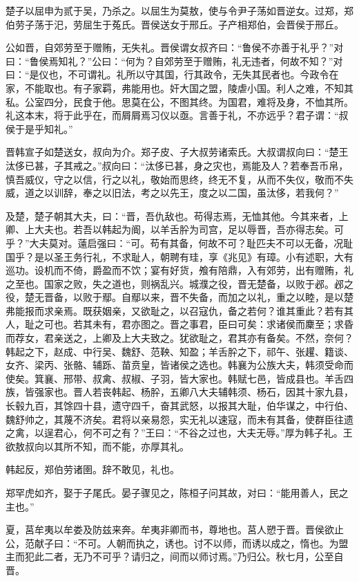 \documentclass[]{article}
\begin{document}
楚子以屈申为贰于吴，乃杀之。以屈生为莫敖，使与令尹子荡如晋逆女。过郑，郑伯劳子荡于汜，劳屈生于菟氏。晋侯送女于邢丘。子产相郑伯，会晋侯于邢丘。

公如晋，自郊劳至于赠贿，无失礼。晋侯谓女叔齐曰：``鲁侯不亦善于礼乎？''对曰：``鲁侯焉知礼？''公曰：``何为？自郊劳至于赠贿，礼无违者，何故不知？''对曰：``是仪也，不可谓礼。礼所以守其国，行其政令，无失其民者也。今政令在家，不能取也。有子家羁，弗能用也。奸大国之盟，陵虐小国。利人之难，不知其私。公室四分，民食于他。思莫在公，不图其终。为国君，难将及身，不恤其所。礼这本末，将于此乎在，而屑屑焉习仪以亟。言善于礼，不亦远乎？君子谓：``叔侯于是乎知礼。''

晋韩宣子如楚送女，叔向为介。郑子皮、子大叔劳诸索氏。大叔谓叔向曰：``楚王汰侈已甚，子其戒之。''叔向曰：``汰侈已甚，身之灾也，焉能及人？若奉吾币帛，慎吾威仪，守之以信，行之以礼，敬始而思终，终无不复，从而不失仪，敬而不失威，道之以训辞，奉之以旧法，考之以先王，度之以二国，虽汰侈，若我何？''

及楚，楚子朝其大夫，曰：``晋，吾仇敌也。苟得志焉，无恤其他。今其来者，上卿、上大夫也。若吾以韩起为阍，以羊舌肸为司宫，足以辱晋，吾亦得志矣。可乎？''大夫莫对。薳启强曰：``可。苟有其备，何故不可？耻匹夫不可以无备，况耻国乎？是以圣王务行礼，不求耻人，朝聘有珪，享《兆见》有璋。小有述职，大有巡功。设机而不倚，爵盈而不饮；宴有好货，飧有陪鼎，入有郊劳，出有赠贿，礼之至也。国家之败，失之道也，则祸乱兴。城濮之役，晋无楚备，以败于邲。邲之役，楚无晋备，以败于鄢。自鄢以来，晋不失备，而加之以礼，重之以睦，是以楚弗能报而求亲焉。既获姻亲，又欲耻之，以召寇仇，备之若何？谁其重此？若有其人，耻之可也。若其未有，君亦图之。晋之事君，臣曰可矣：求诸侯而麇至；求昏而荐女，君亲送之，上卿及上大夫致之。犹欲耻之，君其亦有备矣。不然，奈何？韩起之下，赵成、中行吴、魏舒、范鞅、知盈；羊舌肸之下，祁午、张趯、籍谈、女齐、梁丙、张骼、辅跞、苗贲皇，皆诸侯之选也。韩襄为公族大夫，韩须受命而使矣。箕襄、邢带、叔禽、叔椒、子羽，皆大家也。韩赋七邑，皆成县也。羊舌四族，皆强家也。晋人若丧韩起、杨肸，五卿八大夫辅韩须、杨石，因其十家九县，长毂九百，其馀四十县，遗守四千，奋其武怒，以报其大耻，伯华谋之，中行伯、魏舒帅之，其蔑不济矣。君将以亲易怨，实无礼以速寇，而未有其备，使群臣往遗之禽，以逞君心，何不可之有？''王曰：``不谷之过也，大夫无辱。''厚为韩子礼。王欲敖叔向以其所不知，而不能，亦厚其礼。

韩起反，郑伯劳诸圉。辞不敢见，礼也。

郑罕虎如齐，娶于子尾氏。晏子骤见之，陈桓子问其故，对曰：``能用善人，民之主也。''

夏，莒牟夷以牟娄及防兹来奔。牟夷非卿而书，尊地也。莒人愬于晋。晋侯欲止公，范献子曰：``不可。人朝而执之，诱也。讨不以师，而诱以成之，惰也。为盟主而犯此二者，无乃不可乎？请归之，间而以师讨焉。''乃归公。秋七月，公至自晋。
\end{document}
